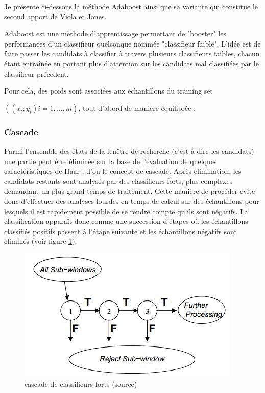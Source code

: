 Je présente ci-dessous la méthode Adaboost ainsi que sa variante qui constitue le second apport de Viola et Jones.

Adaboost est une méthode d'apprentissage permettant de "booster" les performances d'un classifieur quelconque nommée "classifieur faible". L'idée est de faire passer les candidats à classifier à travers plusieurs classifieurs faibles, chacun étant entraînée en portant plus d'attention sur les candidats mal classifiées par le classifieur précédent.

Pour cela, des poids sont associées aux échantillons du training set

$((x_i; y_i) i = 1,\ldots ,m)$, tout d'abord de manière équilibrée :  


	\subsubsection{Cascade}
	
	Parmi l'ensemble des états de la fenêtre de recherche (c'est-à-dire les candidats) une partie peut être éliminée sur la base de l'évaluation de quelques caractéristiques de Haar : d'où le concept de cascade. Après élimination, les candidats restants sont analysés par des classifieurs forts, plus complexes demandant un plus grand temps de traitement. Cette manière de procéder évite donc d'effectuer des analyses lourdes en temps de calcul sur des échantillons pour lesquels il est rapidement possible de se rendre compte qu'ils sont négatifs. La classification apparaît donc comme une succession d'étapes où les échantillons classifiés positifs passent à l'étape suivante et les échantillons négatifs sont éliminés (voir figure \ref{fig:cacasde}).
	
	\begin{figure}[htbp]
		\centering
			\includegraphics{cacasde.JPG}
		\caption[cascade de classifieurs forts]{cascade de classifieurs forts (source\citep{VIO})}
		\label{fig:cacasde}
	\end{figure}
	
